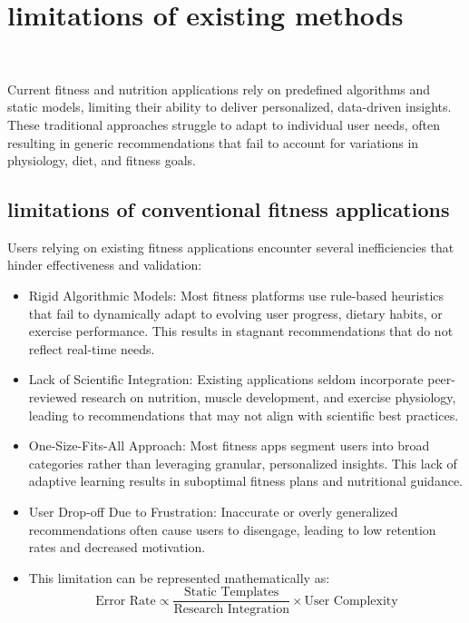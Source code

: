 \documentclass[conference]{IEEEtran}
\begin{document}
\section{limitations of existing methods}\

Current fitness and nutrition applications rely on predefined algorithms and static models, limiting their ability to deliver personalized, data-driven insights. These traditional approaches struggle to adapt to individual user needs, often resulting in generic recommendations that fail to account for variations in physiology, diet, and fitness goals.

\subsection{limitations of conventional fitness applications}

Users relying on existing fitness applications encounter several inefficiencies that hinder effectiveness and validation:\\

\begin{itemize}
	\item Rigid Algorithmic Models: Most fitness platforms use rule-based heuristics that fail to dynamically adapt to evolving user progress, dietary habits, or exercise performance. This results in stagnant recommendations that do not reflect real-time needs.
	\item Lack of Scientific Integration: Existing applications seldom incorporate peer-reviewed research on nutrition, muscle development, and exercise physiology, leading to recommendations that may not align with scientific best practices. \cite{7}
	\item One-Size-Fits-All Approach: Most fitness apps segment users into broad categories rather than leveraging granular, personalized insights. This lack of adaptive learning results in suboptimal fitness plans and nutritional guidance.
	\item User Drop-off Due to Frustration: Inaccurate or overly generalized recommendations often cause users to disengage, leading to low retention rates and decreased motivation. \cite{8}
        \item This limitation can be represented mathematically as:
            \begin{equation}
            \text{Error Rate} \propto \frac{\text{Static Templates}}{\text{Research Integration}} \times \text{User Complexity}
\end{equation}
\end{itemize}
\end{document}
